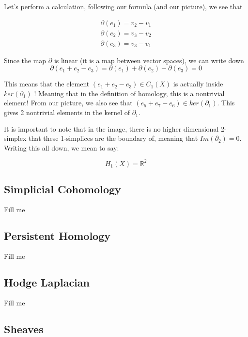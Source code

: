 \documentclass[12pt]{article}
\begin{document}
Let's perform a calculation, following our formula (and our picture), we see that

\begin{align*}
\partial(e_1) = v_2 - v_1 \\
\partial(e_2) = v_3 - v_2 \\
\partial(e_3) = v_3 - v_1
\end{align*}

Since the map $\partial$ is linear (it is a map between vector spaces), we can write
down 
\begin{equation*}
\partial(e_1 + e_2 - e_3) = \partial(e_1) + \partial(e_2) - \partial(e_3) = 0
\end{equation*}

This means that the element $(e_1 + e_2 - e_3) \in C_1(X)$ is actually inside $ker(\partial_1)$ !
Meaning that in the definition of homology, this is a nontrivial element! From our picture, we also
see that $(e_5 + e_7 - e_6) \in ker(\partial_1)$. This gives 2 nontrivial elements in the kernel of $\partial_1$.

It is important to note that in the image, there is no higher dimensional 2-simplex that these 1-simplices are the
boundary of, meaning that $Im(\partial_2) = 0$. Writing this all down, we mean to say:

\begin{equation*}
  H_1(X) = \mathbb{R}^2
\end{equation*}


\subsection{Simplicial Cohomology}

Fill me

\subsection{Persistent Homology}

Fill me

\subsection{Hodge Laplacian}

Fill me 

\subsection{Sheaves}
\end{document}
